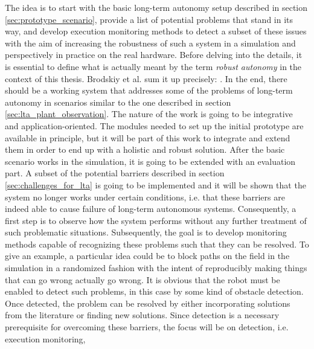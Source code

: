\documentclass[english, master, utf8]{base/thesis_KBS}
\begin{document}
\noindent
The idea is to start with the basic long-term autonomy setup described in section \ref{sec:prototype_scenario}, provide a list of potential problems that 
stand in its way, and develop execution monitoring methods to detect a subset of these issues with the aim of increasing the robustness of such a system in a simulation
and perspectively in practice on the real hardware. Before delving into the details, it is essential to define what is actually meant by the term \textit{robust autonomy} in the
context of this thesis. Brodskiy et al. sum it up precisely: . \cite{Brodskiy:2011}
In the end, there should be a working system that addresses some of the problems of long-term autonomy
in scenarios similar to the one described in section \ref{sec:lta_plant_observation}. The nature of the work is going to be integrative and application-oriented. The modules 
needed to set up the initial prototype are available in principle, but it will be part of this work to integrate and extend them in order to end up with a holistic and robust
solution. After the basic scenario works in the simulation, it is going to be extended with an evaluation part. A subset of the potential barriers described in section 
\ref{sec:challenges_for_lta} is going to be implemented and it will be shown that the system no longer works under certain conditions, i.e. that these
barriers are indeed able to cause failure of long-term autonomous systems. Consequently, a first step is to observe how the system performs without any further 
treatment of such problematic situations.
Subsequently, the goal is to develop monitoring methods capable of recognizing these problems such that they can be resolved.
To give an example, a particular idea could be to block paths on the field in the simulation in a randomized fashion with the intent of reproducibly making things that 
can go wrong actually go wrong.
It is obvious that the robot must be enabled to detect such problems, in this case by some kind of obstacle detection.
Once detected, the problem can be resolved by either incorporating solutions from the literature or finding new solutions.
Since detection is a necessary prerequisite for overcoming these barriers, the focus will be on detection, i.e. execution monitoring,
\end{document}
